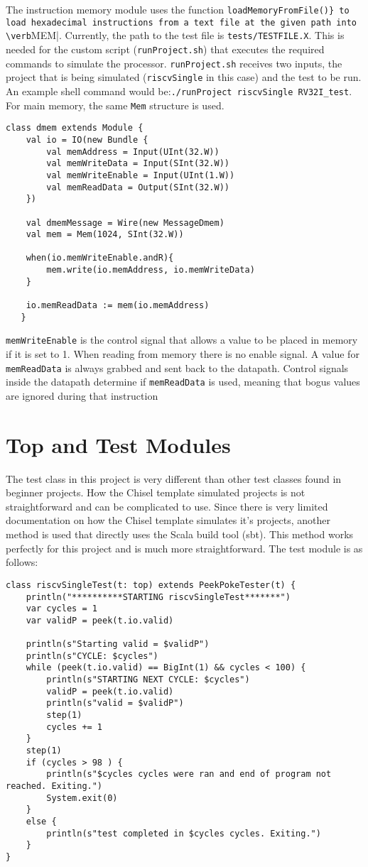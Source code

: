 \documentclass[12pt, letterpaper]{report}
\begin{document}
\noindent The instruction memory module uses the function \verb|loadMemoryFromFile()} to load hexadecimal instructions from a text file at the given path into \verb|MEM|.
Currently, the path to the test file is \verb|tests/TESTFILE.X|.
This is needed for the custom script (\verb|runProject.sh|) that executes the required commands to simulate the processor.
\verb|runProject.sh| receives two inputs, the project that is being simulated (\verb|riscvSingle| in this case) and the test to be run.
An example shell command would be:\verb|./runProject riscvSingle RV32I_test|.
For main memory, the same \verb|Mem| structure is used.

\begin{lstlisting}[style=scala]
   class dmem extends Module {
    val io = IO(new Bundle {
	    val memAddress = Input(UInt(32.W))
	    val memWriteData = Input(SInt(32.W))
	    val memWriteEnable = Input(UInt(1.W))
	    val memReadData = Output(SInt(32.W))
    })
    
    val dmemMessage = Wire(new MessageDmem)
    val mem = Mem(1024, SInt(32.W))
    
    when(io.memWriteEnable.andR){
    	mem.write(io.memAddress, io.memWriteData)
    }
    
    io.memReadData := mem(io.memAddress)
   }
\end{lstlisting}

\noindent \verb|memWriteEnable| is the control signal that allows a value to be placed in memory if it is set to 1.
When reading from memory there is no enable signal. 
A value for \verb|memReadData| is always grabbed and sent back to the datapath.
Control signals inside the datapath determine if \verb|memReadData| is used, meaning that bogus values are ignored during that instruction

\section{Top and Test Modules}
The test class in this project is very different than other test classes found in beginner projects.
How the Chisel template simulated projects is not straightforward and can be complicated to use.
Since there is very limited documentation on how the Chisel template simulates it's projects, another method is used that directly uses the Scala build tool (sbt).
This method works perfectly for this project and is much more straightforward.
The test module is as follows:

\begin{lstlisting}[style=scala]
class riscvSingleTest(t: top) extends PeekPokeTester(t) {
	println("**********STARTING riscvSingleTest*******")
	var cycles = 1
	var validP = peek(t.io.valid)
	
	println(s"Starting valid = $validP")
	println(s"CYCLE: $cycles")
	while (peek(t.io.valid) == BigInt(1) && cycles < 100) {
		println(s"STARTING NEXT CYCLE: $cycles")
		validP = peek(t.io.valid)
		println(s"valid = $validP")
		step(1)
		cycles += 1
	}
	step(1)
	if (cycles > 98 ) {
		println(s"$cycles cycles were ran and end of program not reached. Exiting.")
		System.exit(0)
	}
	else {
		println(s"test completed in $cycles cycles. Exiting.")
	}
}
\end{lstlisting}
\end{document}
